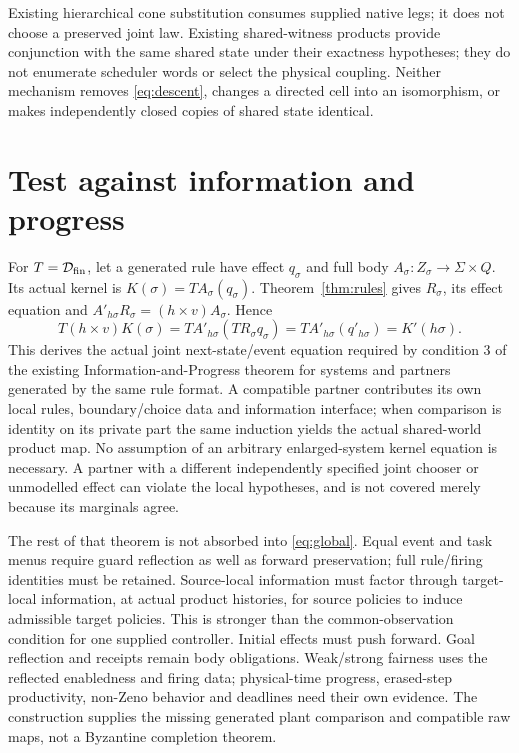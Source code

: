 \documentclass[11pt]{article}
\begin{document}
Existing hierarchical cone substitution consumes supplied native legs; it does not choose a preserved joint law. Existing shared-witness products provide conjunction with the same shared state under their exactness hypotheses; they do not enumerate scheduler words or select the physical coupling. Neither mechanism removes \eqref{eq:descent}, changes a directed cell into an isomorphism, or makes independently closed copies of shared state identical.

\section{Test against information and progress}

For $T=\mathcal D_{\rm fin}$, let a generated rule have effect $q_\sigma$ and full body $A_\sigma:Z_\sigma\to\Sigma\times Q$. Its actual kernel is $K(\sigma)=T A_\sigma(q_\sigma)$. Theorem~\ref{thm:rules} gives $R_\sigma$, its effect equation and $A'_{h\sigma}R_\sigma=(h\times v)A_\sigma$. Hence
\[
 T(h\times v)K(\sigma)
 =T A'_{h\sigma}(TR_\sigma q_\sigma)
 =T A'_{h\sigma}(q'_{h\sigma})
 =K'(h\sigma). \tag{J}\label{eq:global}
\]
This derives the actual joint next-state/event equation required by condition 3 of the existing Information-and-Progress theorem for systems and partners generated by the same rule format. A compatible partner contributes its own local rules, boundary/choice data and information interface; when comparison is identity on its private part the same induction yields the actual shared-world product map. No assumption of an arbitrary enlarged-system kernel equation is necessary. A partner with a different independently specified joint chooser or unmodelled effect can violate the local hypotheses, and is not covered merely because its marginals agree.

The rest of that theorem is not absorbed into \eqref{eq:global}. Equal event and task menus require guard reflection as well as forward preservation; full rule/firing identities must be retained. Source-local information must factor through target-local information, at actual product histories, for source policies to induce admissible target policies. This is stronger than the common-observation condition for one supplied controller. Initial effects must push forward. Goal reflection and receipts remain body obligations. Weak/strong fairness uses the reflected enabledness and firing data; physical-time progress, erased-step productivity, non-Zeno behavior and deadlines need their own evidence. The construction supplies the missing generated plant comparison and compatible raw maps, not a Byzantine completion theorem.
\end{document}
